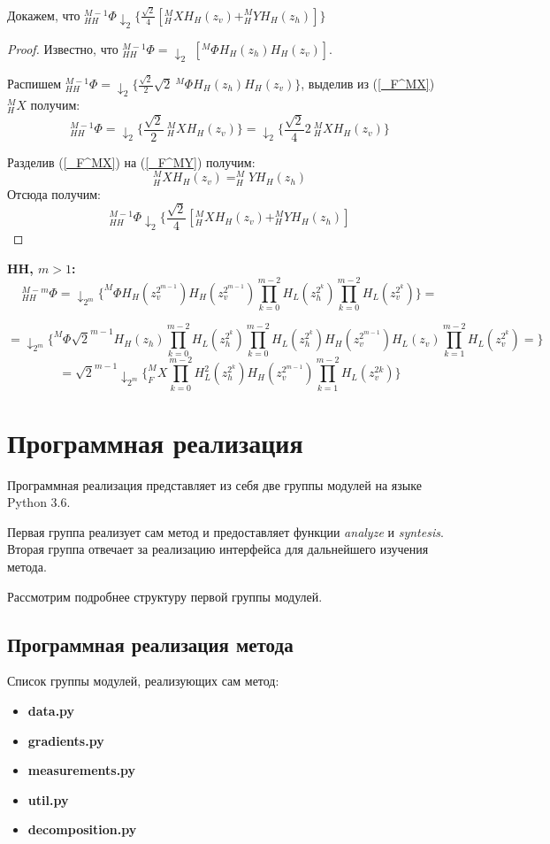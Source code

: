 \documentclass[oneside, final, 14pt]{article}
\begin{document}
Докажем, что $_{HH}^{M-1}\Phi\downarrow_2 \{\frac{\sqrt{2}}{4}[_{H}^MX H_H(z_v) + _{H}^MY H_H(z_h)]\}$
\begin{proof}
Известно, что $_{HH}^{M-1}\Phi = \downarrow_2$ $ [^{M}\Phi H_H(z_h)H_H(z_v)]$.

Распишем \begin{math} _{HH}^{M-1}\Phi = \downarrow_2 \{ \frac{\sqrt{2}}{2}\sqrt{2} ~^{M}\Phi H_H(z_h)H_H(z_v) \} \end{math}, выделив из (\ref{_F^MX}) $_H^MX$ получим:
\[
 _{HH}^{M-1}\Phi = \downarrow_2 \{\frac{\sqrt{2}}{2} ~_{H}^MX H_H(z_v)\} = \downarrow_2 \{\frac{\sqrt{2}}{4}2 ~_{H}^MX H_H(z_v)\}
\]

Разделив (\ref{_F^MX}) на (\ref{_F^MY}) получим:
\[
_{H}^MX H_H(z_v) = _{H}^MY H_H(z_h)
\]
Отсюда получим:
\[
_{HH}^{M-1}\Phi\downarrow_2 \{\frac{\sqrt{2}}{4}[_{H}^MX H_H(z_v) + _{H}^MY H_H(z_h)]
\]
\end{proof}

\textbf{HH, $m>1$:}
\[
_{HH}^{M-m}\Phi=\downarrow_{2^m} \{^M\Phi H_H(z_v^{2^{m-1}}) H_H(z_v^{2^{m-1}}) \prod\limits_{k = 0}^{m-2} H_L(z_h^{2^k})
							\prod\limits_{k = 0}^{m-2} H_L(z_v^{2^k})\}=\]
							
\[
=\downarrow_{2^m} \{^M\Phi \sqrt{2}^{m-1} H_H(z_h) \prod \limits_{k=0}^{m-2} H_L(z_h^{2^k})   
\prod \limits_{k=0}^{m-2} H_L(z_h^{2^k}) H_H(z_v^{2^{m-1}})H_L(z_v) \prod \limits _{k=1}^{m-2}H_L(z_v^{2^k})=
  \}
\]
\[
=\sqrt{2}^{m-1} \downarrow_{2^m} \{_F^MX \prod \limits_{k=0}^{m-2} H_L^2(z_h^{2^k}) H_H(z_v^{2^{m-1}}) \prod \limits_{k=1}^{m-2}H_L(z_v^{2k})    \}
\]

\section{Программная реализация}
Программная реализация представляет из себя две группы модулей на языке Python 3.6. 

Первая группа реализует сам метод и предоставляет функции \textit{analyze} и \textit{syntesis}. Вторая группа отвечает за реализацию интерфейса для дальнейшего изучения метода.

Рассмотрим подробнее структуру первой группы модулей.

\subsection{Программная реализация метода}
Список группы модулей, реализующих сам метод:
\begin{itemize}
\item \textbf{data.py}
\item \textbf{gradients.py}
\item \textbf{measurements.py}
\item \textbf{util.py}
\item \textbf{decomposition.py}
\end{itemize}
\end{document}

